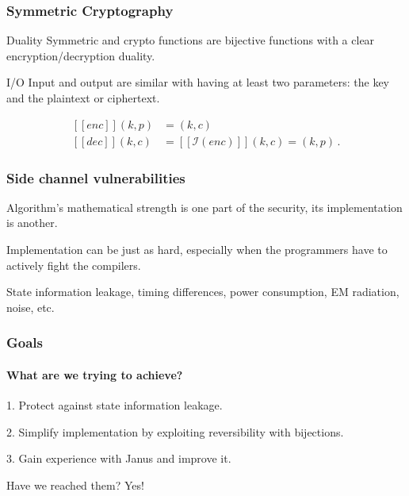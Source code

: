 \documentclass{beamer}
\def\enc{\ensuremath{\mathit{enc}}}
\def\dec{\ensuremath{\mathit{dec}}}
\newcommand{\inv}[1]{\ensuremath{\mathcal{I}(#1)}}
\newcommand{\exe}[1]{\ensuremath{[\![#1]\!]}}
\begin{document}
\addtocounter{page}{1}
\begin{frame}
\addtocounter{page}{-1}
\frametitle{Symmetric Cryptography}


\begin{block}{Duality}
Symmetric and crypto functions are bijective functions with a clear encryption/decryption duality.
\end{block}

\begin{block}{I/O}
Input and output are similar with having at least two parameters: the key and the plaintext or ciphertext.
\end{block}

\begin{block}{}
\begin{align*}
\exe{\enc}(k,p) &= (k,c) \\
\exe{\dec}(k,c) &= \exe{\inv{\enc}}(k,c) = (k,p) \,.
\end{align*}
\end{block}

\end{frame}



\addtocounter{page}{1}
\begin{frame}
\addtocounter{page}{-1}
\frametitle{Side channel vulnerabilities}

\begin{block}{}
Algorithm's mathematical strength is one part of the security, its implementation is another.
\end{block}
\pause
\begin{block}{}
Implementation can be just as hard, especially when the programmers have to actively fight the compilers.
\end{block}

State information leakage, timing differences, power consumption, EM radiation, noise, etc.


\end{frame}


\addtocounter{page}{1}
\begin{frame}
\addtocounter{page}{-1}
\frametitle{Goals}
\framesubtitle{\hspace{5mm}What are we trying to achieve?} 

\pause
\begin{block}{}
1. Protect against state information leakage.
\end{block}

\pause
\begin{block}{}
2. Simplify implementation by exploiting reversibility with bijections.
\end{block}

\pause
\begin{block}{}
3. Gain experience with Janus and improve it.
\end{block}

\pause
Have we reached them?
\pause
Yes!

\end{frame}
\end{document}
